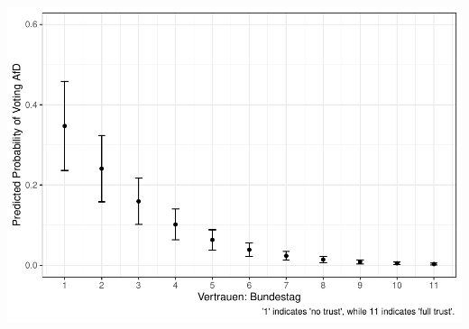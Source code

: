 \documentclass[
]{article}
\begin{document}
\includegraphics{AVCD_Final_Assignment-Edenhofer_files/figure-latex/afd-trust-parliament-1.pdf}
\end{document}
